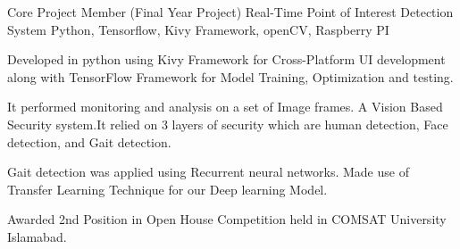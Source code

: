 \begin{cventries}
  \cventry
    {Core Project Member (Final Year Project)} %
    {Real-Time Point of Interest Detection System} %
    {Python, Tensorflow, Kivy Framework, openCV, Raspberry PI} %
    {} %
    {
      \begin{cvitems} %
        \item {Developed in python using Kivy Framework for Cross-Platform UI development along with TensorFlow
        Framework for Model Training, Optimization and testing.}
        \item {It performed monitoring and analysis on a set of Image frames. A Vision Based Security system.It relied on
        3 layers of security which are human detection, Face detection, and Gait detection.}
        \item {Gait detection was applied using Recurrent neural networks. Made use of Transfer Learning Technique for
        our Deep learning Model.}
        \item {Awarded 2nd Position in Open House Competition held in COMSAT University Islamabad.}
      \end{cvitems}
    }





\end{cventries}
